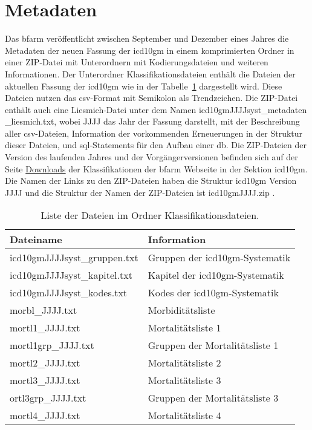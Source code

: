\section{Metadaten} \label{sec:metadata}

Das \ac{bfarm} veröffentlicht zwischen September und Dezember eines Jahres die Metadaten der neuen Fassung der \ac{icd10gm} in einem komprimierten Ordner in einer ZIP-Datei mit Unterordnern  mit Kodierungsdateien und weiteren Informationen. Der Unterordner Klassifikationsdateien enthält die Dateien der aktuellen Fassung der \ac{icd10gm} wie in der Tabelle~\ref{tab:classfiles} dargestellt wird. Diese Dateien nutzen das \ac{csv}-Format mit Semikolon als Trendzeichen. Die ZIP-Datei enthält auch eine Liesmich-Datei unter dem Namen \glqq\textsf{icd10gmJJJJsyst\_metadaten \_liesmich.txt}\grqq{}, wobei \glqq\textsf{JJJJ}\grqq{} das Jahr der Fassung darstellt, mit der Beschreibung aller \ac{csv}-Dateien, Information der vorkommenden Erneuerungen in der Struktur dieser Dateien, und \ac{sql}-Statements für den Aufbau einer \ac{db}. Die ZIP-Dateien der Version des laufenden Jahres und der Vorgängerversionen befinden sich auf der Seite \href{https://www.dimdi.de/dynamic/de/klassifikationen/downloads/}{Downloads} der Klassifikationen der \ac{bfarm} Webseite in der Sektion \ac{icd10gm}. Die Namen der Links zu den ZIP-Dateien haben die Struktur \glqq\textsf{\ac{icd10gm} Version JJJJ}\grqq{} und die Struktur der Namen der ZIP-Dateien ist \glqq\textsf{\ac{icd10gm}JJJJ.zip}\grqq{} .


\begin{table}[ht]
	\centering
	\small
	\caption{Liste der Dateien im Ordner Klassifikationsdateien.}
	\label{tab:classfiles}
	\begin{tabular}{|l|l|}
		\hline
		\rowcolor{lightgray} Dateiname & Information \\
		\hline 
		\textsf{icd10gmJJJJsyst\_gruppen.txt} &  Gruppen der \ac{icd10gm}-Systematik \\ \hline
		\textsf{icd10gmJJJJsyst\_kapitel.txt} & Kapitel der \ac{icd10gm}-Systematik \\ \hline
		\textsf{icd10gmJJJJsyst\_kodes.txt} & Kodes der \ac{icd10gm}-Systematik \\ \hline
		\textsf{morbl\_JJJJ.txt} & Morbiditätsliste  \\ \hline
		\textsf{mortl1\_JJJJ.txt} & Mortalitätsliste 1 \\ \hline
		\textsf{mortl1grp\_JJJJ.txt} & Gruppen der Mortalitätsliste 1 \\ \hline
		\textsf{mortl2\_JJJJ.txt} & Mortalitätsliste 2 \\ \hline
		\textsf{mortl3\_JJJJ.txt} & Mortalitätsliste 3 \\ \hline
		\textsf{ortl3grp\_JJJJ.txt} & Gruppen der Mortalitätsliste 3 \\ \hline
		\textsf{mortl4\_JJJJ.txt} & Mortalitätsliste 4 \\ \hline
	\end{tabular}
\end{table}